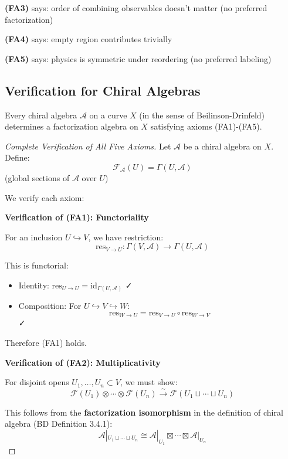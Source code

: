 \begin{example}
\begin{remark}
\textbf{(FA3)} says: order of combining observables doesn't matter (no preferred 
factorization)

\textbf{(FA4)} says: empty region contributes trivially

\textbf{(FA5)} says: physics is symmetric under reordering (no preferred labeling)
\end{remark}

\subsection{Verification for Chiral Algebras}

\begin{theorem}
\label{thm:chiral-factorization}
Every chiral algebra $\mathcal{A}$ on a curve $X$ (in the sense of Beilinson-Drinfeld) 
determines a factorization algebra on $X$ satisfying axioms (FA1)-(FA5).
\end{theorem}

\begin{proof}[Complete Verification of All Five Axioms]

Let $\mathcal{A}$ be a chiral algebra on $X$. Define:
$$\mathcal{F}_{\mathcal{A}}(U) = \Gamma(U, \mathcal{A})$$
(global sections of $\mathcal{A}$ over $U$)

We verify each axiom:

\textbf{Verification of (FA1): Functoriality}

For an inclusion $U \hookrightarrow V$, we have restriction:
$$\text{res}_{V \to U}: \Gamma(V, \mathcal{A}) \to \Gamma(U, \mathcal{A})$$

This is functorial:
\begin{itemize}
\item Identity: $\text{res}_{U \to U} = \text{id}_{\Gamma(U,\mathcal{A})}$ ✓
\item Composition: For $U \hookrightarrow V \hookrightarrow W$:
   $$\text{res}_{W \to U} = \text{res}_{V \to U} \circ \text{res}_{W \to V}$$ ✓
\end{itemize}

Therefore (FA1) holds.

\textbf{Verification of (FA2): Multiplicativity}

For disjoint opens $U_1, \ldots, U_n \subset V$, we must show:
$$\mathcal{F}(U_1) \otimes \cdots \otimes \mathcal{F}(U_n) \xrightarrow{\sim} 
   \mathcal{F}(U_1 \sqcup \cdots \sqcup U_n)$$

This follows from the \textbf{factorization isomorphism} in the definition of chiral 
algebra (BD Definition 3.4.1):
$$\mathcal{A}|_{U_1 \sqcup \cdots \sqcup U_n} \cong 
   \mathcal{A}|_{U_1} \boxtimes \cdots \boxtimes \mathcal{A}|_{U_n}$$


\end{proof}
\end{example}
